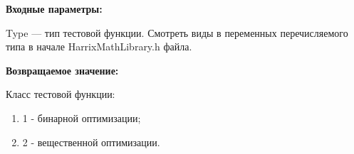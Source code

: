 \textbf{Входные параметры:}

Type --- тип тестовой функции. Смотреть виды в переменных перечисляемого типа в начале HarrixMathLibrary.h файла.

\textbf{Возвращаемое значение:}

Класс тестовой функции:

\begin{enumerate}
\item 1 - бинарной оптимизации;
\item 2 - вещественной оптимизации.
\end{enumerate}